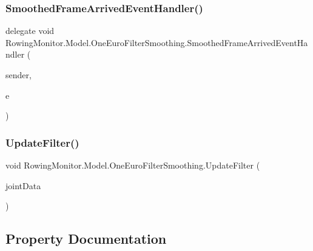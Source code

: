 \subsubsection{\texorpdfstring{Smoothed\+Frame\+Arrived\+Event\+Handler()}{SmoothedFrameArrivedEventHandler()}}
{\footnotesize\ttfamily delegate void Rowing\+Monitor.\+Model.\+One\+Euro\+Filter\+Smoothing.\+Smoothed\+Frame\+Arrived\+Event\+Handler (\begin{DoxyParamCaption}\item[{Object}]{sender,  }\item[{\hyperlink{class_rowing_monitor_1_1_model_1_1_smoothed_frame_arrived_event_args}{Smoothed\+Frame\+Arrived\+Event\+Args}}]{e }\end{DoxyParamCaption})}

\mbox{\label{class_rowing_monitor_1_1_model_1_1_one_euro_filter_smoothing_a2dcb40fcf4cd02302a23f421f710ac8c}} 
\subsubsection{\texorpdfstring{Update\+Filter()}{UpdateFilter()}}
{\footnotesize\ttfamily void Rowing\+Monitor.\+Model.\+One\+Euro\+Filter\+Smoothing.\+Update\+Filter (\begin{DoxyParamCaption}\item[{\hyperlink{struct_rowing_monitor_1_1_model_1_1_util_1_1_joint_data}{Joint\+Data}}]{joint\+Data }\end{DoxyParamCaption})}



\subsection{Property Documentation}
\mbox{\label{class_rowing_monitor_1_1_model_1_1_one_euro_filter_smoothing_abbe908f1d7748febfc27336f42b95a6f}} 
